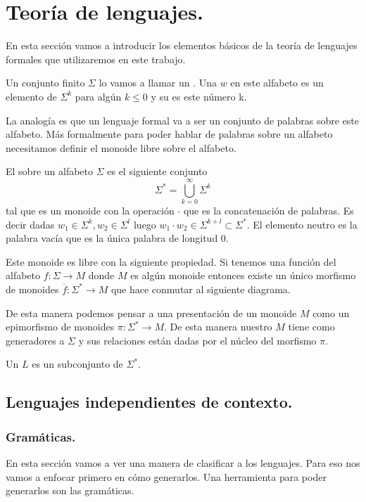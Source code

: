 \documentclass[tesis.tex]{subfiles}
\begin{document}
\section{Teoría de lenguajes.}	
En esta sección vamos a introducir los elementos básicos de la teoría de lenguajes formales que utilizaremos en este trabajo. 
\begin{deff}
Un conjunto finito $\Sigma$ lo vamos a llamar un . Una  $w$ en este alfabeto es un elemento de $\Sigma^k$ para algún $k \le 0$ y su  es este número k.
\end{deff}
La analogía es que un lenguaje formal va a ser un conjunto de palabras sobre este alfabeto. Más formalmente para poder hablar de palabras sobre un alfabeto necesitamos definir el monoide libre sobre el alfabeto.
\begin{deff}
	El  sobre un alfabeto $\Sigma$ es el siguiente conjunto
	\[
	\Sigma^{*} = \bigcup_{k=0}^{\infty} \Sigma^k
	\]
	tal que es un monoide con la operación $\cdot$ que es la concatenación de palabras. Es decir dadas $w_1 \in \Sigma^{k}, w_2 \in \Sigma^{l}$ luego $w_1 \cdot w_2 \in \Sigma^{k+l} \subset \Sigma^*$. El elemento neutro es la palabra vacía que es la única palabra de longitud $0$. 
\end{deff}

\begin{obs}
	Este monoide es libre con la siguiente propiedad. Si tenemos una función del alfabeto $f: \Sigma \to M$ donde $M$ es algún monoide entonces existe un único morfismo de monoides $\overline f: \Sigma^{*} \to M$ que hace conmutar al siguiente diagrama.
\end{obs}

\begin{obs}
	De esta manera podemos pensar a una {presentación} de un monoide $M$  como un epimorfismo de monoides $\pi: \Sigma^{*} \to M$. De esta manera nuestro $M$ tiene como generadores a $\Sigma$ y sus relaciones están dadas por el núcleo del morfismo $\pi$.
\end{obs}

\begin{deff}
	Un  $L$ es un subconjunto de $\Sigma^{*}$. 
\end{deff}

\subsection{Lenguajes independientes de contexto.}
\subsubsection{Gramáticas.}
En esta sección vamos a ver una manera de clasificar a los lenguajes. Para eso nos vamos a enfocar primero en cómo generarlos. Una herramienta para poder generarlos son las gramáticas.
\end{document}
